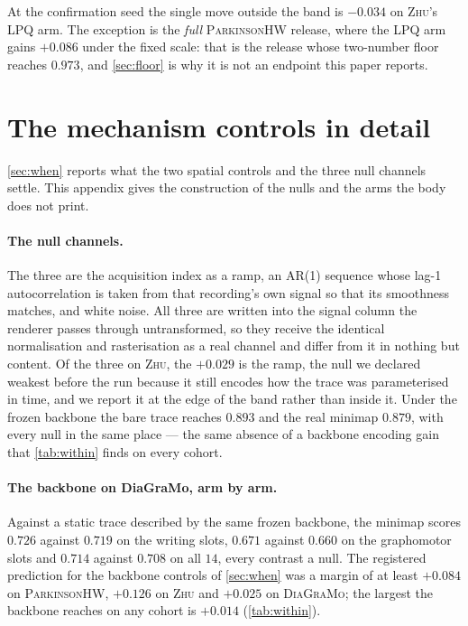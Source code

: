 \documentclass{article}
\begin{document}
At the confirmation seed the single move outside the band is $-0.034$ on \textsc{Zhu}'s LPQ arm.
The exception is the \emph{full} \textsc{ParkinsonHW} release, where the LPQ arm gains $+0.086$
under the fixed scale: that is the release whose two-number floor reaches $0.973$, and
\cref{sec:floor} is why it is not an endpoint this paper reports.

\section{The mechanism controls in detail}
\label{sec:controls-appendix}

\cref{sec:when} reports what the two spatial controls and the three null channels settle. This
appendix gives the construction of the nulls and the arms the body does not print.

\paragraph{The null channels.} The three are the acquisition index as a ramp, an AR(1) sequence
whose lag-1 autocorrelation is taken from that recording's own signal so that its smoothness
matches, and white noise. All three are written into the signal column the renderer passes through
untransformed, so they receive the identical normalisation and rasterisation as a real channel and
differ from it in nothing but content. Of the three on \textsc{Zhu}, the $+0.029$ is the ramp, the
null we declared weakest before the run because it still encodes how the trace was parameterised in
time, and we report it at the edge of the band rather than inside it. Under the frozen backbone the
bare trace reaches $0.893$ and the real minimap $0.879$, with every null in the same place --- the
same absence of a backbone encoding gain that \cref{tab:within} finds on every cohort.

\paragraph{The backbone on DiaGraMo, arm by arm.} Against a static trace described by the same
frozen backbone, the minimap scores $0.726$ against $0.719$ on the writing slots, $0.671$ against
$0.660$ on the graphomotor slots and $0.714$ against $0.708$ on all $14$, every contrast a null.
The registered prediction for the backbone controls of \cref{sec:when} was a margin of at least
$+0.084$ on \textsc{ParkinsonHW}, $+0.126$ on \textsc{Zhu} and $+0.025$ on \textsc{DiaGraMo}; the
largest the backbone reaches on any cohort is $+0.014$ (\cref{tab:within}).
\end{document}
